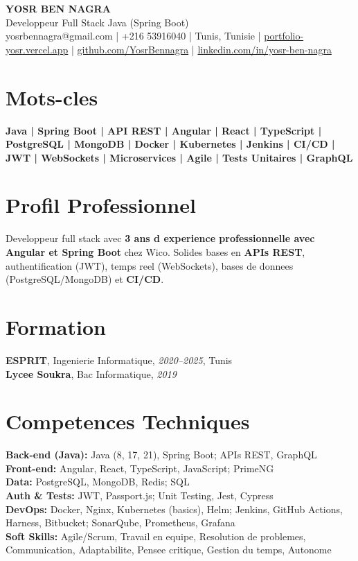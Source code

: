 \documentclass[10pt,a4paper]{article}
\begin{document}
\begin{center}
  {\Large\bfseries YOSR BEN NAGRA}\\[2pt]
  {\small Developpeur Full Stack Java (Spring Boot)}\\[3pt]
  {\footnotesize yosrbennagra@gmail.com \;|\; +216 53916040 \;|\; Tunis, Tunisie \;|\; \href{https://portfolio-yosr.vercel.app/en}{portfolio-yosr.vercel.app} \;|\; \href{https://github.com/YosrBennagra}{github.com/YosrBennagra} \;|\; \href{https://www.linkedin.com/in/yosr-ben-nagra/}{linkedin.com/in/yosr-ben-nagra}}
\end{center}

\section*{Mots-cles}
{\small\textbf{
Java | Spring Boot | API REST | Angular | React | TypeScript | PostgreSQL | MongoDB | Docker | Kubernetes | Jenkins | CI/CD | JWT | WebSockets | Microservices | Agile | Tests Unitaires | GraphQL
}}

\vspace{4pt}

\section*{Profil Professionnel}
{\small
Developpeur full stack avec \textbf{3 ans d experience professionnelle avec Angular et Spring Boot} chez Wico. Solides bases en \textbf{APIs REST}, authentification (JWT), temps reel (WebSockets), bases de donnees (PostgreSQL/MongoDB) et \textbf{CI/CD}.
}

\vspace{4pt}

\section*{Formation}
{\small
\textbf{ESPRIT}, Ingenierie Informatique, \textit{2020--2025}, Tunis\\[1pt]
\textbf{Lycee Soukra}, Bac Informatique, \textit{2019}
}

\vspace{4pt}

\section*{Competences Techniques}
{\small
\textbf{Back-end (Java):} Java (8, 17, 21), Spring Boot; APIs REST, GraphQL\\[2pt]
\textbf{Front-end:} Angular, React, TypeScript, JavaScript; PrimeNG\\[2pt]
\textbf{Data:} PostgreSQL, MongoDB, Redis; SQL\\[2pt]
\textbf{Auth \& Tests:} JWT, Passport.js; Unit Testing, Jest, Cypress\\[2pt]
\textbf{DevOps:} Docker, Nginx, Kubernetes (basics), Helm; Jenkins, GitHub Actions, Harness, Bitbucket; SonarQube, Prometheus, Grafana\\[2pt]
\textbf{Soft Skills:} Agile/Scrum, Travail en equipe, Resolution de problemes, Communication, Adaptabilite, Pensee critique, Gestion du temps, Autonome
}
\end{document}
